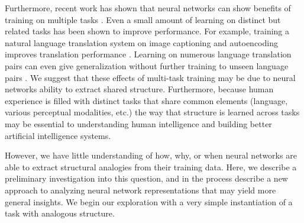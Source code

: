 \documentclass[10pt,letterpaper]{article}
\begin{document}
Furthermore, recent work has shown that neural networks can show benefits of training on multiple tasks \cite[e.g.]{Dong2015,Rusu2015}. Even a small amount of learning on distinct but related tasks has been shown to improve performance. For example, training a natural language translation system on image captioning and autoencoding improves translation performance \citep{Luong2016}. Learning on numerous language translation pairs can even give generalization without further training to unseen language pairs \citep{Johnson2016a}. We suggest that these effects of multi-task training may be due to neural networks ability to extract shared structure. Furthermore, because human experience is filled with distinct tasks that share common elements (language, various perceptual modalities, etc.) the way that structure is learned across tasks may be essential to understanding human intelligence and building better artificial intelligence systems.\par
However, we have little understanding of how, why, or when neural networks are able to extract structural analogies from their training data. Here, we describe a preliminary investigation into this question, and in the process describe a new approach to analyzing neural network representations that may yield more general insights. We begin our exploration with a very simple instantiation of a task with analogous structure. \par 
\end{document}
